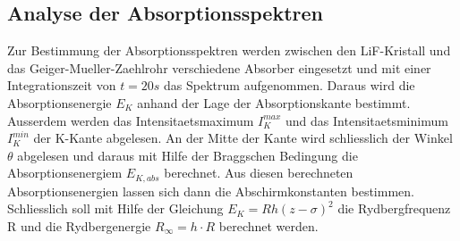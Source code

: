 \subsection{Analyse der Absorptionsspektren}
Zur Bestimmung der Absorptionsspektren werden zwischen den LiF-Kristall und das Geiger-Mueller-Zaehlrohr verschiedene Absorber eingesetzt und mit einer Integrationszeit von $t=20s$ das Spektrum aufgenommen. Daraus wird die Absorptionsenergie $E_K$ anhand der Lage der Absorptionskante bestimmt. Ausserdem werden das Intensitaetsmaximum $I^{max}_K$ und das Intensitaetsminimum $I^{min}_K$ der K-Kante abgelesen. An der Mitte der Kante wird schliesslich der Winkel $\theta$ abgelesen und daraus mit Hilfe der Braggschen Bedingung die Absorptionsenergiem $E_{K,abs}$ berechnet. Aus diesen berechneten Absorptionsenergien lassen sich dann die Abschirmkonstanten bestimmen. Schliesslich soll mit Hilfe der Gleichung $E_K=Rh(z-\sigma)^2$ die Rydbergfrequenz R und die Rydbergenergie $R_\infty=h\cdot R$ berechnet werden. 